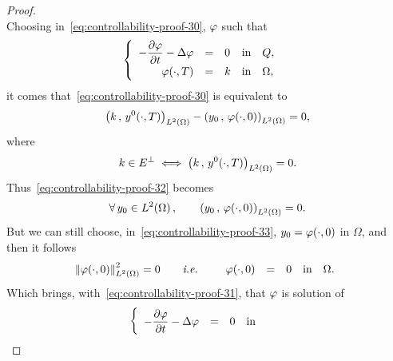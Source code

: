 \begin{proof}
\begin{equation}
    \end{equation}
    Choosing in~\eqref{eq:controllability-proof-30}, $\varphi$ such that
    \begin{equation}\label{eq:controllability-proof-31}
        \begin{cases}\displaystyle
            \begin{array}{rclll}
                -\dfrac{\partial{}\varphi}{\partial{}t} - \Delta\varphi & = & 0 & \text{in} & Q,\\
                \varphi\!\left({\cdot,T}\right) & = & k & \text{in} &
                \Omega,
            \end{array}
        \end{cases}
    \end{equation}
    it comes that~\eqref{eq:controllability-proof-30} is equivalent to
    \begin{equation}\label{eq:controllability-proof-32}
        \scalaireohm{k}{y^{0}\!\left({\cdot,T}\right)} - \scalaireohm{%
            y_{0}
        }{%
            \vphi\!\left({\cdot,0}\right)
        } = 0,
    \end{equation}
    where
    \begin{equation*}
        k\in E^{\perp}\iff {\left({ k\,,\,y^{0}\!\left({\cdot,T}\right) }\right)}_{L^{2}\left({\Omega}\right)} =
        0.
    \end{equation*}
    Thus~\eqref{eq:controllability-proof-32} becomes
    \begin{equation}\label{eq:controllability-proof-33}
        \forall\,y_{0}\in\Ldeux{\Omega},\qquad \scalaireohm{y_{0}}{%
            \vphi\!\left({\cdot,0}\right)
        } = 0.
    \end{equation}
    But we can still choose, in~\eqref{eq:controllability-proof-33},
    $\displaystyle y_{0} = \varphi\!\left({\cdot,0}\right)$ in $\Omega$, and
    then it follows
    \begin{equation*}
        {\left\|{\varphi\!\left({\cdot,0}\right) }\right\|}_{L^{2}\left({\Omega}\right)}^{2} = 0\qquad\textit{i.e.}\qquad
        \begin{array}{rclll}
            \varphi\!\left({\cdot,0}\right) & = & 0 & \text{in} & \Omega.
        \end{array}
    \end{equation*}
    Which brings, with~\eqref{eq:controllability-proof-31}, that $\varphi$ is
    solution of
    \begin{equation*}
        \begin{cases}\displaystyle
            \begin{array}{rclll}
                -\dfrac{\partial{}\varphi}{\partial{}t} - \Delta\varphi & = & 0 & \text{in} &

\end{array}
\end{cases}
\end{equation*}
\end{proof}
